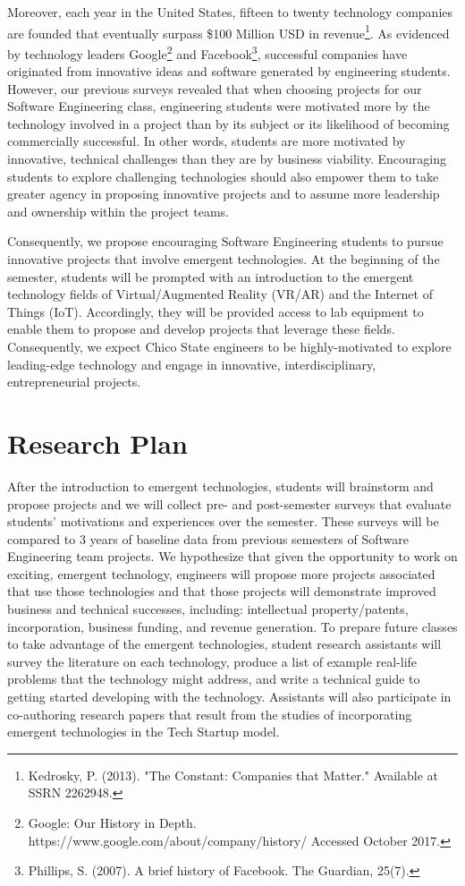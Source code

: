 \documentclass[letterpaper]{article}
\begin{document}
  Moreover, each year in the United States, fifteen to twenty technology companies are founded that eventually surpass \$100 Million USD in revenue\footnote{Kedrosky, P. (2013). "The Constant: Companies that Matter." Available at SSRN 2262948.}. As evidenced by technology leaders Google\footnote{Google: Our History in Depth. https://www.google.com/about/company/history/ Accessed October 2017.} and Facebook\footnote{Phillips, S. (2007). A brief history of Facebook. The Guardian, 25(7).}, successful companies have originated from innovative ideas and software generated by engineering students. However, our previous surveys revealed that when choosing projects for our Software Engineering class, engineering students were motivated more by the technology involved in a project than by its subject or its likelihood of becoming commercially successful. In other words, students are more motivated by innovative, technical challenges than they are by business viability. Encouraging students to explore challenging technologies should also empower them to take greater agency in proposing innovative projects and to assume more leadership and ownership within the project teams.

  Consequently, we propose encouraging Software Engineering students to pursue innovative projects that involve emergent technologies. At the beginning of the semester, students will be prompted with an introduction to the emergent technology fields of Virtual/Augmented Reality (VR/AR) and the Internet of Things (IoT). Accordingly, they will be provided access to lab equipment to enable them to propose and develop projects that leverage these fields. Consequently, we expect Chico State engineers to be highly-motivated to explore leading-edge technology and engage in innovative, interdisciplinary, entrepreneurial projects.\newpage

  \section{Research Plan}
  After the introduction to emergent technologies, students will brainstorm and propose projects and we will collect pre- and post-semester surveys that evaluate students' motivations and experiences over the semester. These surveys will be compared to 3 years of baseline data from previous semesters of Software Engineering team projects. We hypothesize that given the opportunity to work on exciting, emergent technology, engineers will propose more projects associated that use those technologies and that those projects will demonstrate improved business and technical successes, including: intellectual property/patents, incorporation, business funding, and revenue generation. To prepare future classes to take advantage of the emergent technologies, student research assistants will survey the literature on each technology, produce a list of example real-life problems that the technology might address, and write a technical guide to getting started developing with the technology. Assistants will also participate in co-authoring research papers that result from the studies of incorporating emergent technologies in the Tech Startup model.
\end{document}
